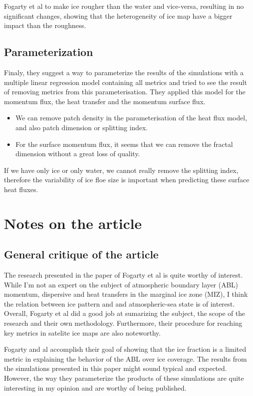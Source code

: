 \documentclass[10pt]{article}
\numberwithin{equation}{section}
\begin{document}
Fogarty et al to make ice rougher than the water and vice-versa, resulting in no significant changes, showing that the heterogeneity of ice map have a bigger impact than the roughness.
\subsection{Parameterization}
\label{sec:org1d4895d}

Finaly, they suggest a way to parameterize the results of the simulations with a multiple linear regression model containing all metrics and tried to see the result of removing metrics from this parameterisation. They applied this model for the momentum flux, the heat transfer and the momentum surface flux.
\begin{itemize}
\item We can remove patch density in the parameterisation of the heat flux model, and also patch dimension or splitting index.
\item For the surface momentum flux, it seems that we can remove the fractal dimension without a great loss of quality.
\end{itemize}

If we have only ice or only water, we cannot really remove the splitting index, therefore the variability of ice floe size is important when predicting these surface heat fluxes.
\section{Notes on the article}
\label{sec:org98f5b05}

\subsection{General critique of the article}
\label{sec:org735df2e}

The research presented in the paper of Fogarty et al is quite worthy of interest.
While I'm not an expert on the subject of atmospheric boundary layer (ABL) momentum, dispersive and heat transfers in the marginal ice zone (MIZ), I think the relation between ice pattern and and atmospheric-sea state is of interest. Overall, Fogarty et al did a good job at sumarizing the subject, the scope of the research and their own methodology. Furthermore, their procedure for reaching key metrics in satelite ice maps are also noteworthy. \bigskip

Fogarty and al accomplish their goal of showing that the ice fraction is a limited metric in explaining the behavior of the ABL over ice coverage. The results from the simulations presented in this paper might sound typical and expected. However, the way they parameterize the products of these simulations are quite interesting in my opinion and are worthy of being published.\bigskip
\end{document}

